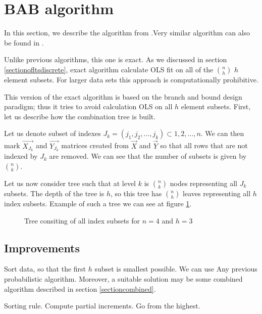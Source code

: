 \section{BAB algorithm} \label{sectionbab}
In this section, we describe the algorithm from \cite{agullo2001new}.Very similar algorithm can also be found in \cite{hofmann2010matrix}.

Unlike previous algorithms, this one is exact. As we discussed in section \ref{sectionofltsdiscrete}, exact algorithm calculate OLS fit on all of the $\binom{n}{h}$ $h$ element subsets. For larger data sets this approach is computationally prohibitive.

This version of the exact algorithm is based on the branch and bound design paradigm; thus it tries to avoid calculation OLS on all $h$ element subsets. First, let us describe how the combination tree is built. 

Let us denote subset of indexes 
$J_k = (j_1, j_2, \ldots , j_k) \subset {1,2,\ldots , n}$. We can then mark
$\vec{ X_{J_k} }$ and $\vec{ Y_{J_k} }$ matrices created from $\vec{X}$
and $\vec{Y}$ so that all rows that are not indexed by $J_k$ are removed.
We can see that the number of subsets is given by $\binom{n}{k}$.

Let us now consider tree such that at level $k$ is $\binom{n}{k}$ nodes representing all $J_k$ subsets. The depth of the tree is $h$, so this tree has $\binom{n}{h}$ leaves representing all $h$ index subsets. Example of such a tree we can see at figure \ref{figure:full:tree}.

\begin{figure}[h]
\centering
{}
\caption{Tree consiting of all index subsets for $n=4$ and $h=3$}
\label{figure:full:tree}
\end{figure}


\subsection{Improvements}

Sort data, so that the first $h$ subset is smallest possible. We can use Any previous probabilistic algorithm. Moreover, a suitable solution may be some combined algorithm described in section \ref{sectioncombined}.

Sorting rule. Compute partial increments. Go from the highest.






